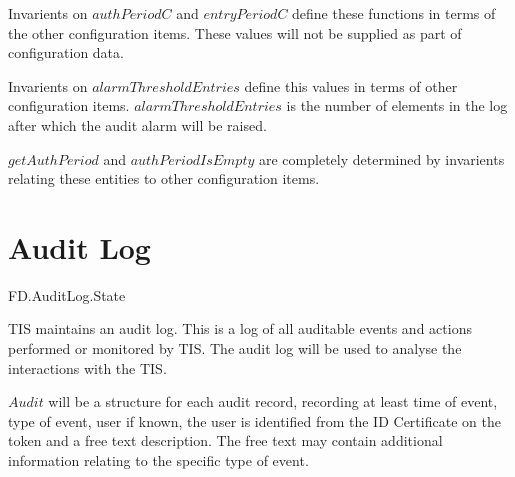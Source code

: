 \begin{Zcomment}
\item
Invarients on $authPeriodC$ and $entryPeriodC$ define these functions
in terms of the other configuration items. These values will not be
supplied as part of configuration data.
\item
Invarients on  $alarmThresholdEntries$ define this
values in terms of other configuration items. 
$alarmThresholdEntries$ is the number of elements in the log after
which the audit alarm will be raised.
\item
$getAuthPeriod$ and $authPeriodIsEmpty$ are completely determined by
invarients relating these entities to other configuration items.
\end{Zcomment}

\section{Audit Log}

\begin{traceunit}{FD.AuditLog.State}
\end{traceunit}

TIS maintains an audit log. This is a log of all auditable events and
actions performed or monitored by TIS. The audit log will be used to
analyse the interactions with the TIS.

$Audit$ will be a structure for each audit record, 
recording at least time of event, type of event, user if known, the
user is identified from the ID Certificate on the token and a free
text description. The free text may contain additional information
relating to the specific type of event.

